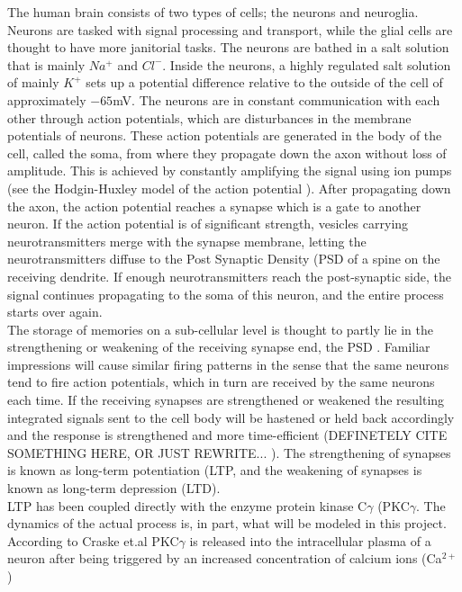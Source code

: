 The human brain consists of two types of cells; the neurons and neuroglia. 
Neurons are tasked with signal processing and transport, while the glial cells are thought to have more janitorial tasks. 
The neurons are bathed in a salt solution that is mainly $Na^+$ and $Cl^-$. 
Inside the neurons, a highly regulated salt solution of mainly $K^+$ sets up a potential difference relative to the outside of the cell of approximately $-65$mV.
The neurons are in constant communication with each other through action potentials, which are disturbances in the membrane potentials of neurons. 
These action potentials are generated in the body of the cell, called the soma, from where they propagate down the axon without loss of amplitude. 
This is achieved by constantly amplifying the signal using ion pumps (see the Hodgin-Huxley model of the action potential \cite{graham2011principles}).
After propagating down the axon, the action potential reaches a synapse which is a gate to another neuron. 
If the action potential is of significant strength, vesicles carrying neurotransmitters merge with the synapse membrane, letting the neurotransmitters diffuse to the Post Synaptic Density (PSD of a spine on the receiving dendrite.
If enough neurotransmitters reach the post-synaptic side, the signal continues propagating to the soma of this neuron, and the entire process starts over again. \\
The storage of memories on a sub-cellular level is thought to partly lie in the strengthening or weakening of the receiving synapse end, the PSD \cite{}. 
Familiar impressions will cause similar firing patterns in the sense that the same neurons tend to fire action potentials, which in turn are received by the same neurons each time. 
If the receiving synapses are strengthened or weakened the resulting integrated signals sent to the cell body will be hastened or held back accordingly and the response is strengthened and more time-efficient (DEFINETELY CITE SOMETHING HERE, OR JUST REWRITE... \cite{}). 
The strengthening of synapses is known as long-term potentiation (LTP, and the weakening of synapses is known as long-term depression (LTD). \\

LTP has been coupled directly with the enzyme protein kinase C${\gamma}$ (PKC$\gamma$. 
The dynamics of the actual process is, in part, what will be modeled in this project. 
According to Craske et.al \cite{craske2005spines} PKC$\gamma$ is released into the intracellular plasma of a neuron after being triggered by an increased concentration of calcium ions (Ca$^{2+}$)


